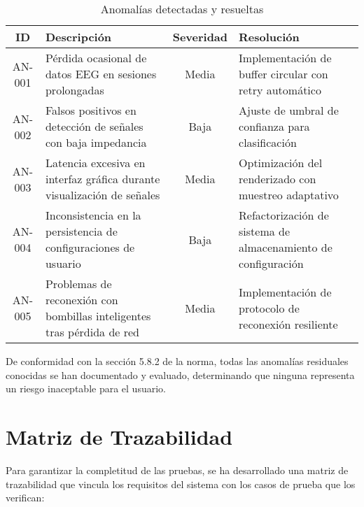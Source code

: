 \begin{table}[ht]
    \centering
    \begin{tabular}{|c|p{6cm}|c|p{3.5cm}|}
        \hline
        \textbf{ID} & \textbf{Descripción} & \textbf{Severidad} & \textbf{Resolución} \\
        \hline
        AN-001 & Pérdida ocasional de datos EEG en sesiones prolongadas & Media & Implementación de buffer circular con retry automático \\
        \hline
        AN-002 & Falsos positivos en detección de señales con baja impedancia & Baja & Ajuste de umbral de confianza para clasificación \\
        \hline
        AN-003 & Latencia excesiva en interfaz gráfica durante visualización de señales & Media & Optimización del renderizado con muestreo adaptativo \\
        \hline
        AN-004 & Inconsistencia en la persistencia de configuraciones de usuario & Baja & Refactorización de sistema de almacenamiento de configuración \\
        \hline
        AN-005 & Problemas de reconexión con bombillas inteligentes tras pérdida de red & Media & Implementación de protocolo de reconexión resiliente \\
        \hline
    \end{tabular}
    \caption{Anomalías detectadas y resueltas}
    \label{tab:anomalies}
\end{table}

De conformidad con la sección 5.8.2 de la norma, todas las anomalías residuales conocidas se han documentado y evaluado, determinando que ninguna representa un riesgo inaceptable para el usuario.

\newpage
\section{Matriz de Trazabilidad}

Para garantizar la completitud de las pruebas, se ha desarrollado una matriz de trazabilidad que vincula los requisitos del sistema con los casos de prueba que los verifican:


